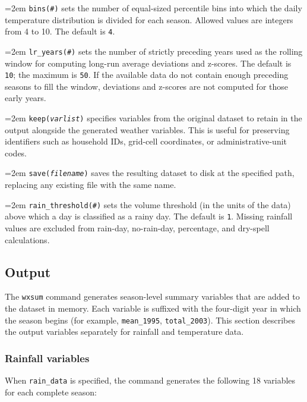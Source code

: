 \hangindent=2em
\texttt{bins(\textit{\#})} sets the number of equal-sized percentile bins into which the daily temperature distribution is divided for each season. Allowed values are integers from 4 to 10. The default is \texttt{4}.

\hangindent=2em
\texttt{lr\_years(\textit{\#})} sets the number of strictly preceding years used as the rolling window for computing long-run average deviations and z-scores. The default is \texttt{10}; the maximum is \texttt{50}. If the available data do not contain enough preceding seasons to fill the window, deviations and z-scores are not computed for those early years.

\hangindent=2em
\texttt{keep(\textit{varlist})} specifies variables from the original dataset to retain in the output alongside the generated weather variables. This is useful for preserving identifiers such as household IDs, grid-cell coordinates, or administrative-unit codes.

\hangindent=2em
\texttt{save(\textit{filename})} saves the resulting dataset to disk at the specified path, replacing any existing file with the same name.

\hangindent=2em
\texttt{rain\_threshold(\textit{\#})} sets the volume threshold (in the units of the data) above which a day is classified as a rainy day. The default is \texttt{1}. Missing rainfall values are excluded from rain-day, no-rain-day, percentage, and dry-spell calculations.

\subsection{Output}

The \texttt{wxsum} command generates season-level summary variables that are added to the dataset in memory. Each variable is suffixed with the four-digit year in which the season begins (for example, \texttt{mean\_1995}, \texttt{total\_2003}). This section describes the output variables separately for rainfall and temperature data.

\subsubsection{Rainfall variables}

When \texttt{rain\_data} is specified, the command generates the following 18 variables for each complete season:

